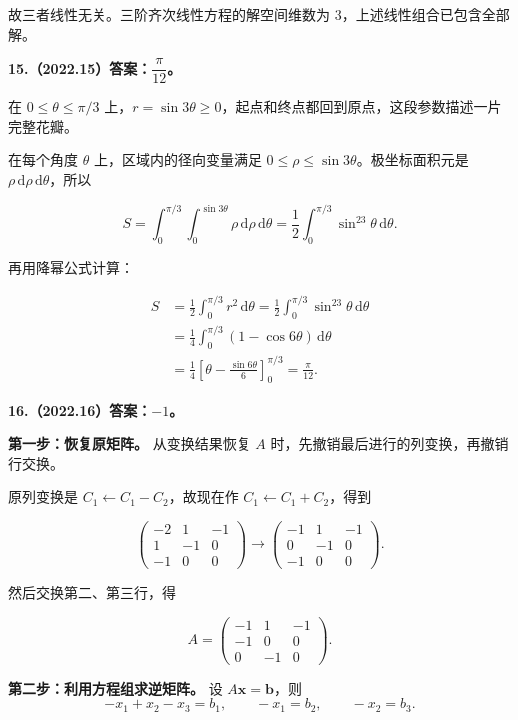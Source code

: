 \documentclass[UTF8,11pt,fontset=windows]{ctexart}
\begin{document}
故三者线性无关。三阶齐次线性方程的解空间维数为 $3$，上述线性组合已包含全部解。

\clearpage

\textbf{15.（2022.15）答案：$\dfrac{\pi}{12}$。}

在 $0\le\theta\le\pi/3$ 上，$r=\sin3\theta\ge0$，起点和终点都回到原点，这段参数描述一片完整花瓣。

在每个角度 $\theta$ 上，区域内的径向变量满足 $0\le\rho\le\sin3\theta$。极坐标面积元是 $\rho\,\mathrm d\rho\,\mathrm d\theta$，所以

$$
S=\int_0^{\pi/3}\int_0^{\sin3\theta}\rho\,\mathrm d\rho\,\mathrm d\theta
=\frac12\int_0^{\pi/3}\sin^23\theta\,\mathrm d\theta.
$$

再用降幂公式计算：

$$
\begin{aligned}
S&=\frac12\int_0^{\pi/3}r^2\,\mathrm d\theta
=\frac12\int_0^{\pi/3}\sin^23\theta\,\mathrm d\theta\\
&=\frac14\int_0^{\pi/3}(1-\cos6\theta)\,\mathrm d\theta\\
&=\frac14\left[\theta-\frac{\sin6\theta}{6}\right]_0^{\pi/3}
=\frac\pi{12}.
\end{aligned}
$$

\clearpage

\textbf{16.（2022.16）答案：$-1$。}

\textbf{第一步：恢复原矩阵。} 从变换结果恢复 $A$ 时，先撤销最后进行的列变换，再撤销行交换。

原列变换是 $C_1\leftarrow C_1-C_2$，故现在作 $C_1\leftarrow C_1+C_2$，得到

$$
\begin{pmatrix}-2&1&-1\\1&-1&0\\-1&0&0\end{pmatrix}
\longrightarrow
\begin{pmatrix}-1&1&-1\\0&-1&0\\-1&0&0\end{pmatrix}.
$$

然后交换第二、第三行，得

$$
A=\begin{pmatrix}-1&1&-1\\-1&0&0\\0&-1&0\end{pmatrix}.
$$

\textbf{第二步：利用方程组求逆矩阵。} 设 $A\boldsymbol x=\boldsymbol b$，则
$$
-x_1+x_2-x_3=b_1,\qquad -x_1=b_2,\qquad -x_2=b_3.
$$
\end{document}
